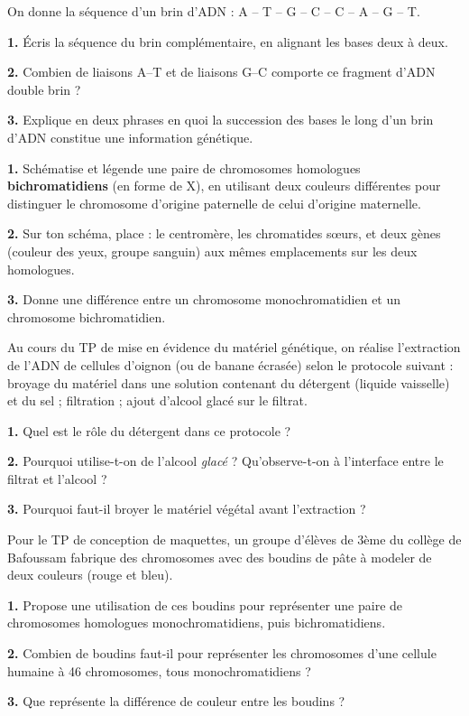 \documentclass[11pt]{article}
\newcommand{\cle}[1]{{\popxbold\color{popdark}#1}}
\newcounter{popsec}
\newcounter{popsub}
\newcommand{\courssub}[1]{%
  \stepcounter{popsub}%
  \par\vspace{9pt}\noindent{\popxbold\fontsize{11.5}{13}\selectfont\color{popink}{\color{poporange}\thepopsec.\thepopsub}\hspace{6pt}#1}\par\nopagebreak\vspace{4pt}
}
\begin{document}
\courssub{Je m'entraîne}

\begin{exercice}
On donne la séquence d'un brin d'ADN : A -- T -- G -- C -- C -- A -- G -- T.

\textbf{1.} Écris la séquence du brin complémentaire, en alignant les bases deux à deux.

\textbf{2.} Combien de liaisons A--T et de liaisons G--C comporte ce fragment d'ADN double brin ?

\textbf{3.} Explique en deux phrases en quoi la succession des bases le long d'un brin d'ADN constitue une \cle{information génétique}.
\end{exercice}

\begin{exercice}
\textbf{1.} Schématise et légende une paire de chromosomes homologues \textbf{bichromatidiens} (en forme de X), en utilisant deux couleurs différentes pour distinguer le chromosome d'origine paternelle de celui d'origine maternelle.

\textbf{2.} Sur ton schéma, place : le centromère, les chromatides sœurs, et deux gènes (couleur des yeux, groupe sanguin) aux mêmes emplacements sur les deux homologues.

\textbf{3.} Donne une différence entre un chromosome monochromatidien et un chromosome bichromatidien.
\end{exercice}

\begin{exercice}
Au cours du TP de mise en évidence du matériel génétique, on réalise l'extraction de l'ADN de cellules d'oignon (ou de banane écrasée) selon le protocole suivant : broyage du matériel dans une solution contenant du détergent (liquide vaisselle) et du sel ; filtration ; ajout d'alcool glacé sur le filtrat.

\textbf{1.} Quel est le rôle du détergent dans ce protocole ?

\textbf{2.} Pourquoi utilise-t-on de l'alcool \emph{glacé} ? Qu'observe-t-on à l'interface entre le filtrat et l'alcool ?

\textbf{3.} Pourquoi faut-il broyer le matériel végétal avant l'extraction ?
\end{exercice}

\begin{exercice}
Pour le TP de conception de maquettes, un groupe d'élèves de 3ème du collège de Bafoussam fabrique des chromosomes avec des boudins de pâte à modeler de deux couleurs (rouge et bleu).

\textbf{1.} Propose une utilisation de ces boudins pour représenter une paire de chromosomes homologues monochromatidiens, puis bichromatidiens.

\textbf{2.} Combien de boudins faut-il pour représenter les chromosomes d'une cellule humaine à 46 chromosomes, tous monochromatidiens ?

\textbf{3.} Que représente la différence de couleur entre les boudins ?
\end{exercice}
\end{document}
